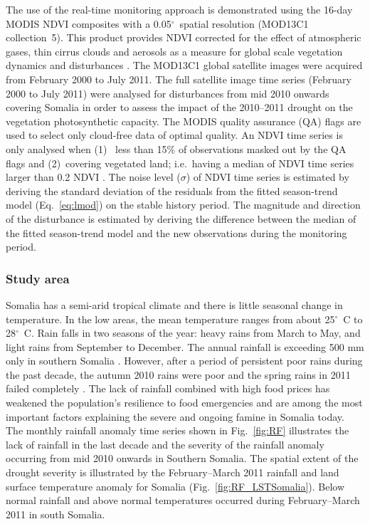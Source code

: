 \documentclass[authoryear,preprint,review,10pt]{elsarticle}
\newcommand{\degree}{\ensuremath{^\circ}}
\begin{document}
The use of the real-time monitoring approach is demonstrated using the 16-day MODIS NDVI composites with a 0.05\degree \ spatial resolution (MOD13C1 collection~5). This product provides  NDVI corrected for the effect of atmospheric gases, thin cirrus clouds and aerosols as a measure for global scale vegetation dynamics and disturbances \citep{Huete2002}. The MOD13C1 global satellite images were acquired from February 2000 to July 2011. The full satellite image time series  (February 2000 to July 2011) were analysed for disturbances from mid 2010 onwards covering Somalia in order to assess the impact of the 2010--2011 drought on the vegetation photosynthetic capacity. The MODIS quality assurance (QA) flags are used to select only cloud-free data of optimal quality. An NDVI time series is only analysed when (1)~ less than 15\% of observations masked out by the QA flags and (2)~covering vegetated land; i.e.\ having a median of NDVI time series larger than 0.2 NDVI \citep{Beurs2009, deJong:wo, Vrieling:2011da}. The noise level ($\sigma$) of NDVI time series is estimated by deriving the standard deviation of the residuals from the fitted season-trend model (Eq.~\ref{eq:lmod}) on the stable history period.  The magnitude and direction of the disturbance is estimated by deriving the difference between the median of the fitted season-trend model and the new observations during the monitoring period.

\subsubsection*{Study area}

Somalia has a semi-arid tropical climate and there is little seasonal change in temperature. In the low areas, the mean temperature ranges from about 25\degree~C to 28\degree~C.  Rain falls in two seasons of the year: heavy rains from March to May, and light rains from September to December. The annual rainfall is exceeding 500 mm only in southern Somalia \citep{Muchiri2007}. However, after a period of persistent poor rains during the past decade, the autumn 2010 rains were poor and the spring rains in 2011 failed completely \citep{Funk:2011fg}. The lack of rainfall combined with high food prices has weakened the population's resilience to food emergencies and are among the most important factors explaining the severe and ongoing famine in Somalia today. The monthly rainfall anomaly time series shown in Fig.~\ref{fig:RF} illustrates the lack of rainfall in the last decade and the severity of the rainfall anomaly occurring from mid 2010 onwards in Southern Somalia. The spatial extent of the drought severity is illustrated by the February--March 2011 rainfall \citep{Xie:1997tw} and land surface temperature anomaly for Somalia (Fig.~\ref{fig:RF_LSTSomalia}). Below normal rainfall and above normal temperatures occurred during February--March 2011 in south Somalia.
\end{document}
